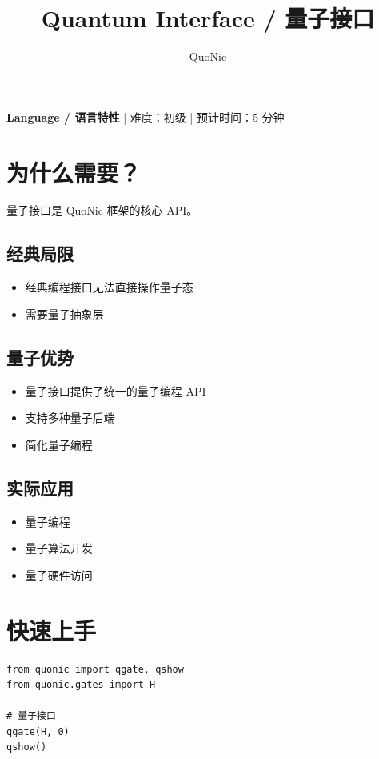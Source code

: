 \documentclass[12pt,a4paper]{article}
\title{Quantum Interface / 量子接口}
\author{QuoNic}
\date{}
\begin{document}
\maketitle

\begin{center}
\textbf{Language / 语言特性} | 难度：初级 | 预计时间：5 分钟
\end{center}

\tableofcontents
\newpage

\section{为什么需要？}

量子接口是 QuoNic 框架的核心 API。

\subsection{经典局限}
\begin{itemize}
  \item 经典编程接口无法直接操作量子态
  \item 需要量子抽象层
\end{itemize}

\subsection{量子优势}
\begin{itemize}
  \item 量子接口提供了统一的量子编程 API
  \item 支持多种量子后端
  \item 简化量子编程
\end{itemize}

\subsection{实际应用}
\begin{itemize}
  \item 量子编程
  \item 量子算法开发
  \item 量子硬件访问
\end{itemize}

\section{快速上手}

\begin{verbatim}
from quonic import qgate, qshow
from quonic.gates import H

# 量子接口
qgate(H, 0)
qshow()
\end{verbatim}
\end{document}
